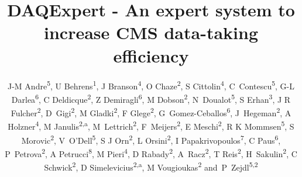 \documentclass[a4paper]{jpconf}
\begin{document}
\title{DAQExpert - An expert system to increase CMS data-taking efficiency}

\author{J-M Andre\textsuperscript{5}, U Behrens\textsuperscript{1}, J Branson\textsuperscript{4}, O Chaze\textsuperscript{2}, S Cittolin\textsuperscript{4}, C~Contescu\textsuperscript{5}, G-L Darlea\textsuperscript{6}, C Deldicque\textsuperscript{2}, Z Demiragli\textsuperscript{6}, M Dobson\textsuperscript{2}, N~Doualot\textsuperscript{5}, S Erhan\textsuperscript{3}, J R Fulcher\textsuperscript{2}, D~Gigi\textsuperscript{2}, M Gladki\textsuperscript{2}, F Glege\textsuperscript{2}, G~Gomez-Ceballos\textsuperscript{6}, J~Hegeman\textsuperscript{2}, A Holzner\textsuperscript{4}, M Janulis\textsuperscript{2,a}, M~Lettrich\textsuperscript{2}, F~Meijers\textsuperscript{2}, E Meschi\textsuperscript{2}, R K Mommsen\textsuperscript{5}, S Morovic\textsuperscript{2}, V~O'Dell\textsuperscript{5}, S J Orn\textsuperscript{2}, L Orsini\textsuperscript{2}, I Papakrivopoulos\textsuperscript{7}, C Paus\textsuperscript{6}, P~Petrova\textsuperscript{2}, A Petrucci\textsuperscript{8}, M Pieri\textsuperscript{4}, D Rabady\textsuperscript{2}, A~Racz\textsuperscript{2}, T Reis\textsuperscript{2}, H~Sakulin\textsuperscript{2}, C Schwick\textsuperscript{2}, D Simelevicius\textsuperscript{2,a}, M Vougioukas\textsuperscript{2} and~P~Zejdl\textsuperscript{5,2}}

\address{\textsuperscript{1} DESY, Hamburg, Germany}
\address{\textsuperscript{2} CERN, Geneva, Switzerland}
\address{\textsuperscript{3} University of California, Los Angeles, Los Angeles, California, USA}
\address{\textsuperscript{4} University of California, San Diego, San Diego, California, USA}
\address{\textsuperscript{5} FNAL, Chicago, Illinois, USA}
\address{\textsuperscript{6} Massachusetts Institute of Technology, Cambridge, Massachusetts, USA}
\address{\textsuperscript{7} Technical University of Athens, Athens, Greece}
\address{\textsuperscript{8} Rice University, Houston, Texas, USA}
\address{\textsuperscript{a} Also at Vilnius University, Vilnius, Lithuania}

\end{document}
